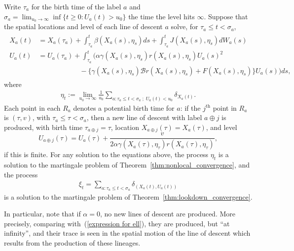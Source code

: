 \documentclass[EJP]{ejpecp} %
\newcommand{\DG}{\mathcal{B}}  %
\newcommand{\lp}{\xi}              %
\newcommand{\concat}{\oplus}   %
\begin{document}
\begin{proposition}
Write $\tau_a$ for the birth time of the label $a$ and 
$\sigma_a = \lim_{u_0 \to \infty} \inf\{t \ge 0: U_a(t) > u_0\}$
the time the level hits $\infty$.
Suppose that the spatial locations and level of each line of descent $a$
solve, for $\tau_a \le t < \sigma_a$,
\begin{align}
    \label{eqn:limiting_construction}
    \begin{split}
X_a(t)
    &=
    X_a(\tau_a)
    + \int_{\tau_a}^{t}
        \beta(X_a(s), \eta_s) ds
    + \int_{\tau_a}^{t}
        J(X_a(s),\eta_s) dW_a(s)
    \\
U_a(t)
    &=
    U_a(\tau_a)
    + \int_{\tau_a}^{t}
    \bigg(
        \alpha \gamma(X_a(s),\eta_s)
        r(X_a(s), \eta_s) U_a(s)^2
\\ &\qquad \qquad \qquad {}   
        -
        \big\{
            \gamma(X_a(s),\eta_s) \DG r(X_a(s),\eta_s)
            + F(X_a(s), \eta_s)
        \big\}
        U_a(s)
    \bigg)
    ds ,
    \end{split}
\end{align}
where
\begin{align*}
    \eta_t
    :=
    \lim_{u_0 \to \infty} \frac{1}{u_0}
        \sum_{a : \tau_a \le t < \sigma_a \; ; \; U_a(t) < u_0} \delta_{X_a(t)} .
\end{align*}
Each point in each $R_a$ denotes a potential birth time for $a$:
if the $j^\text{th}$ point in $R_a$ is $(\tau, v)$, with 
$\tau_a \le \tau < \sigma_a$,
then a new line of descent with label $a \concat j$ is produced,
with birth time $\tau_{a \concat j} = \tau$,
    location $X_{a \concat j}(\tau) = X_a(\tau)$, and level
$$
    U_{a \concat j}(\tau) = U_a(\tau)
    + \frac{v}{ 2 \alpha \gamma(X_a(\tau), \eta_\tau) r(X_a(\tau), \eta_\tau) } ,
$$
if this is finite.
For any solution to the equations above, 
the process $\eta_t$
is a solution to the martingale problem of Theorem~\ref{thm:nonlocal_convergence},
and the process
\begin{align*}
    \lp_t = \sum_{a : \tau_a \le t < \sigma_a} \delta_{(X_a(t), U_a(t))} 
\end{align*}
is a solution to the martingale problem of
Theorem~\ref{thm:lookdown_convergence}.
\end{proposition}

In particular, note that if $\alpha=0$,
no new lines of descent are produced.
More precisely, comparing with~(\ref{expression for ell}),
they are produced, but ``at infinity'',
and their trace is seen in the 
spatial motion of the line of descent which results from
the production of these lineages.
\end{document}
